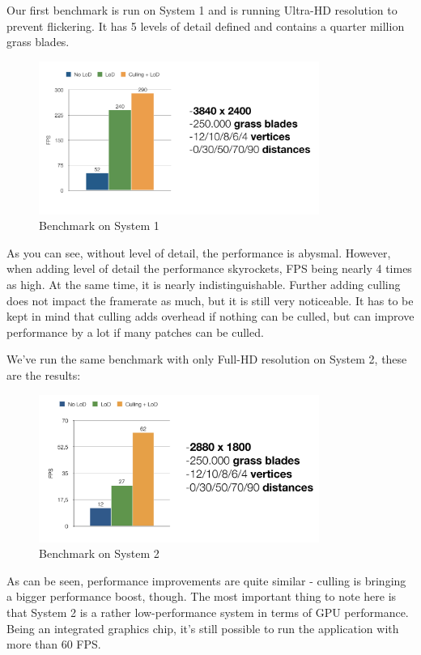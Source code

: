 \documentclass[conference]{acmsiggraph}
\begin{document}
Our first benchmark is run on System 1 and is running Ultra-HD resolution to prevent flickering. It has 5 levels of detail defined and contains a quarter million grass blades.

 \begin{figure}[ht]
   \centering
   \includegraphics[width=3.6in]{images/benchmark1}
   \caption{Benchmark on System 1}
 \end{figure}    

As you can see, without level of detail, the performance is abysmal. However, when adding level of detail the performance skyrockets, FPS being nearly 4 times as high. At the same time, it is nearly indistinguishable. Further adding culling does not impact the framerate as much, but it is still very noticeable. It has to be kept in mind that culling adds overhead if nothing can be culled, but can improve performance by a lot if many patches can be culled.

We've run the same benchmark with only Full-HD resolution on System 2, these are the results:

 \begin{figure}[ht]
   \centering
   \includegraphics[width=3.6in]{images/benchmark2}
   \caption{Benchmark on System 2}
 \end{figure}    

As can be seen, performance improvements are quite similar - culling is bringing a bigger performance boost, though. The most important thing to note here is that System 2 is a rather low-performance system in terms of GPU performance. Being an integrated graphics chip, it's still possible to run the application with more than 60 FPS.
\end{document}
